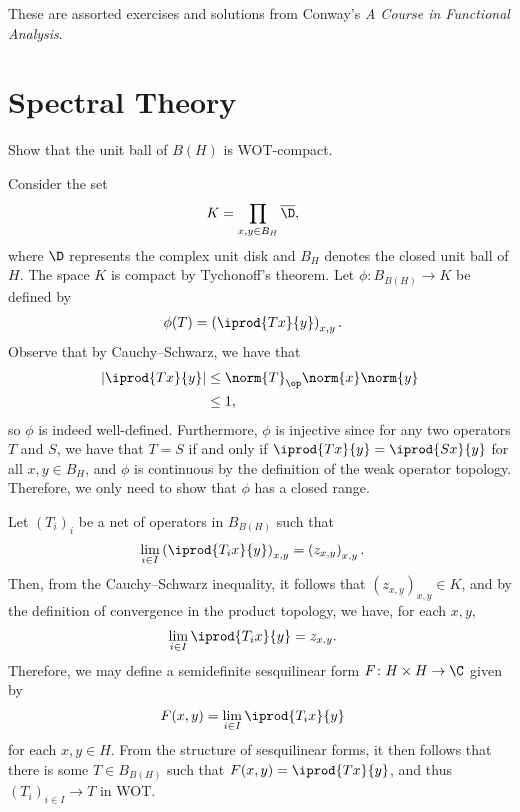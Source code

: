 \documentclass[10pt]{mypackage}
\begin{document}
\RaggedRight
These are assorted exercises and solutions from Conway's \textit{A Course in Functional Analysis}.
\section{Spectral Theory}%

\begin{problem}
  Show that the unit ball of $B(H)$ is WOT-compact.
\end{problem}
\begin{solution}
  Consider the set
  \begin{align*}
    K &= \prod_{x,y\in B_{H}} \overline{\D},
  \end{align*}
  where $\D$ represents the complex unit disk and $B_H$ denotes the closed unit ball of $H$. The space $K$ is compact by Tychonoff's theorem. Let $\phi\colon B_{B(H)}\rightarrow K$ be defined by
  \begin{align*}
    \phi(T) &= \left( \iprod{Tx}{y} \right)_{x,y}.
  \end{align*}
  Observe that by Cauchy--Schwarz, we have that
  \begin{align*}
    \left\vert \iprod{Tx}{y} \right\vert &\leq \norm{T}_{\op}\norm{x}\norm{y}\\
                                         &\leq 1,
  \end{align*}
  so $\phi$ is indeed well-defined. Furthermore, $\phi$ is injective since for any two operators $T$ and $S$, we have that $T = S$ if and only if $ \iprod{Tx}{y} = \iprod{Sx}{y} $ for all $x,y\in B_{H}$, and $\phi$ is continuous by the definition of the weak operator topology. Therefore, we only need to show that $\phi$ has a closed range.

  Let $\left( T_i \right)_i$ be a net of operators in $B_{B(H)}$ such that
  \begin{align*}
    \lim_{i\in I}\left( \iprod{T_i x}{y} \right)_{x,y} &= \left( z_{x,y} \right)_{x,y}.
  \end{align*}
  Then, from the Cauchy--Schwarz inequality, it follows that $\left( z_{x,y} \right)_{x,y}\in K$, and by the definition of convergence in the product topology, we have, for each $x,y$,
  \begin{align*}
    \lim_{i\in I} \iprod{T_i x}{y} &= z_{x,y}.
  \end{align*}
  Therefore, we may define a semidefinite sesquilinear form $F\colon H\times H\rightarrow \C$ given by
  \begin{align*}
    F(x,y) &= \lim_{i\in I} \iprod{T_i x}{y}
  \end{align*}
  for each $x,y\in H$. From the structure of sesquilinear forms, it then follows that there is some $T\in B_{B(H)}$ such that $F(x,y) = \iprod{Tx}{y}$, and thus $\left( T_i \right)_{i\in I}\rightarrow T$ in WOT.
\end{solution}
\end{document}
